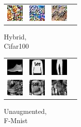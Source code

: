 \begin{figure}[h]
\begin{subtable}{.25\linewidth}
{\begin{tabular}{ l l l l }
             \includegraphics[width = 24pt]{repimages/rec_21_hybrid.jpg} & \includegraphics[width = 24pt]{repimages/rec_22_hybrid.jpg}  & \includegraphics[width = 24pt]{repimages/rec_98_hybrid.jpg}  &   \\
        \end{tabular}}
        \caption{Hybrid, \\ Cifar100}%
    \end{subtable}%
    \hfill
    \begin{subtable}{.25\linewidth}
        \centering
        {\begin{tabular}{ l l l l }
             \includegraphics[width = 24pt]{repimages_fmnist/ori_1_unaug.jpg} & \includegraphics[width = 24pt]{repimages_fmnist/ori_2_unaug.jpg}  & \includegraphics[width = 24pt]{repimages_fmnist/ori_3_unaug.jpg} \\
             \includegraphics[width = 24pt]{repimages_fmnist/rec_1_unaug.jpg} & \includegraphics[width = 24pt]{repimages_fmnist/rec_2_unaug.jpg}  & \includegraphics[width = 24pt]{repimages_fmnist/rec_3_unaug.jpg}  &   \\
        \end{tabular}}
        \caption{Unaugmented, \\ F-Mnist}%

\end{subtable}
\end{figure}
